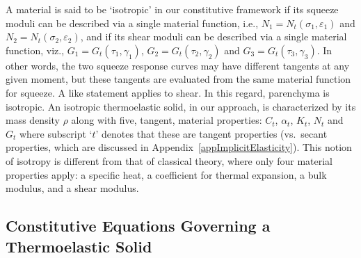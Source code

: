 A material is said to be `isotropic' in our constitutive framework if its squeeze moduli can be described via a single material function, i.e., $N_1 = N_t (\sigma_1 , \varepsilon_1 )$ and $N_2 = N_t ( \sigma_2 , \varepsilon_2 )$, and if its shear moduli can be described via a single material function, viz., $G_1 = G_t ( \tau_1 , \gamma_1 )$, $G_2 = G_t ( \tau_2 , \gamma_2 )$ and $G_3 = G_t ( \tau_3 , \gamma_3 )$.  In other words, the two squeeze response curves may have different tangents at any given moment, but these tangents are evaluated from the same material function for squeeze.  A like statement applies to shear.  In this regard, parenchyma is isotropic.  An isotropic thermo\-elastic solid, in our approach, is characterized by its mass density $\rho$ along with five, tangent, material properties: $C_t$, $\alpha_t$, $K_t$, $N_t$ and $G_t$ where subscript `$t$' denotes that these are tangent properties (vs.\ secant properties, which are discussed in Appendix~\ref{appImplicitElasticity}).  This notion of isotropy is different from that of classical theory, where only four material properties apply: a specific heat, a coefficient for thermal expansion, a bulk modulus, and a shear modulus.

\subsection{Constitutive Equations Governing a Thermoelastic Solid}

